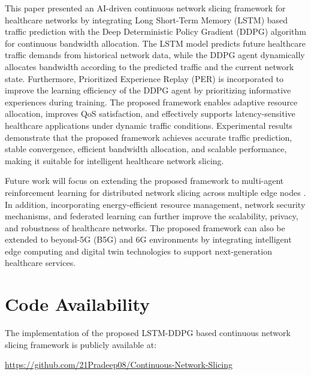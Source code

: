 \documentclass[10pt,journal,compsoc]{IEEEtran}
\begin{document}
This paper presented an AI-driven continuous network slicing framework for healthcare networks by integrating Long Short-Term Memory (LSTM) based traffic prediction with the Deep Deterministic Policy Gradient (DDPG) algorithm for continuous bandwidth allocation. The LSTM model predicts future healthcare traffic demands from historical network data, while the DDPG agent dynamically allocates bandwidth according to the predicted traffic and the current network state. Furthermore, Prioritized Experience Replay (PER) is incorporated to improve the learning efficiency of the DDPG agent by prioritizing informative experiences during training. The proposed framework enables adaptive resource allocation, improves QoS satisfaction, and effectively supports latency-sensitive healthcare applications under dynamic traffic conditions. Experimental results demonstrate that the proposed framework achieves accurate traffic prediction, stable convergence, efficient bandwidth allocation, and scalable performance, making it suitable for intelligent healthcare network slicing.

Future work will focus on extending the proposed framework to multi-agent reinforcement learning for distributed network slicing across multiple edge nodes \cite{zhang2026d2rl}. In addition, incorporating energy-efficient resource management, network security mechanisms, and federated learning can further improve the scalability, privacy, and robustness of healthcare networks. The proposed framework can also be extended to beyond-5G (B5G) and 6G environments by integrating intelligent edge computing and digital twin technologies to support next-generation healthcare services.


\section*{Code Availability}

The implementation of the proposed LSTM-DDPG based continuous network slicing framework is publicly available at:

\url{https://github.com/21Pradeep08/Continuous-Network-Slicing}
    


\nocite{*}


\end{document}
